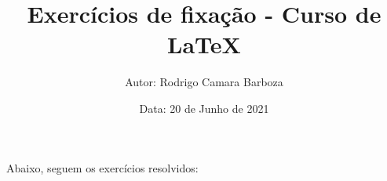 \documentclass[a4paper, 12pt]{article}
\title{\textbf{Exercícios de fixação - Curso de LaTeX}}
\author{Autor: Rodrigo Camara Barboza}
\date{Data: 20 de Junho de 2021}
\begin{document}
\maketitle

Abaixo, seguem os exercícios resolvidos:
\end{document}
